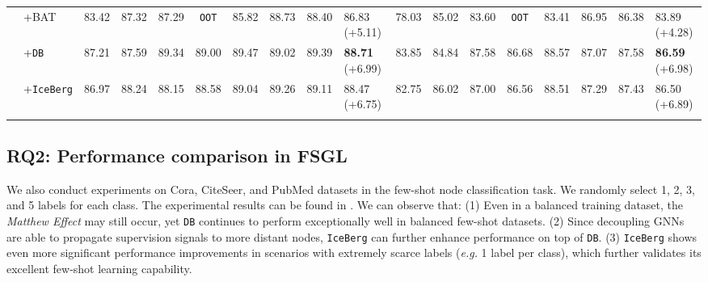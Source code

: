 \begin{table*}[]
{\begin{tabular}{ll|cccccccl|cccccccl}
\multicolumn{1}{l|}{}                           & +BAT & 83.42                        & 87.32                          & 87.29                       & \texttt{OOT}          & 85.82            & 88.73                        & 88.40                        & 86.83 {\small(+5.11)}    & 78.03                        & 85.02                          & 83.60                       & \texttt{OOT}          & 83.41            & 86.95                        & 86.38                        & 83.89 {\small(+4.28)}    \\
\multicolumn{1}{l|}{}                           & +\texttt{DB}  & 87.21                        & 87.59                          & 89.34     & 89.00         & 89.47             & 89.02                        & 89.39                        & \textbf{88.71} {\small(+6.99)}    & 83.85                        & 84.84                          & 87.58                       & 86.68           & 88.57           & 87.07                        & 87.58                        & \textbf{86.59} {\small(+6.98)}    \\
\multicolumn{1}{l|}{}                           & +\texttt{IceBerg} & 86.97                        & 88.24                       & 88.15                       & 88.58                       & 89.04                       & 89.26                        & 89.11                        & 88.47 {\small(+6.75)}    & 82.75                        & 86.02                       & 87.00                       & 86.56                       & 88.51                       & 87.29                        & 87.43                        & 86.50 {\small(+6.89)}    \\   \Xhline{1.2pt}
\end{tabular}}
\label{tab:cigl10}
\end{table*}


\subsection{RQ2: Performance comparison in FSGL}

We also conduct experiments on Cora, CiteSeer, and PubMed datasets in the few-shot node classification task. We randomly select 1, 2, 3, and 5 labels for each class. The experimental results can be found in . We can observe that: (1) Even in a balanced training dataset, the \emph{Matthew Effect} may still occur, yet \texttt{DB} continues to perform exceptionally well in balanced few-shot datasets. (2) Since decoupling GNNs are able to propagate supervision signals to more distant nodes, \texttt{IceBerg} can further enhance performance on top of \texttt{DB}. (3) \texttt{IceBerg} shows even more significant performance improvements in scenarios with extremely scarce labels (\emph{e.g.} 1 label per class), which further validates its excellent few-shot learning capability.


